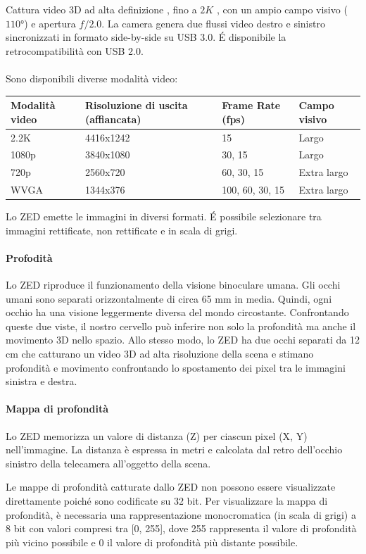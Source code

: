 \documentclass[a4paper]{article}
\begin{document}
Cattura video 3D ad alta definizione , fino a $2K $ , con un ampio campo visivo ($\ang{110}$) e apertura $f/2.0$. La camera genera due flussi video destro e sinistro sincronizzati in formato side-by-side su USB 3.0. \'E disponibile la retrocompatibilità con USB 2.0.
\\
\\
Sono disponibili diverse modalità video:
\begin{center}
\begin{tabular}{llll}
\toprule
Modalità video &Risoluzione di uscita (affiancata) &	Frame Rate (fps) &	Campo visivo \\
\midrule
2.2K&	4416x1242&	15	 &Largo \\
1080p	&3840x1080&	30, 15&	Largo\\
720p&	2560x720&	60, 30, 15&	Extra largo\\
WVGA&	1344x376&	100, 60, 30, 15&	Extra largo\\
\bottomrule
\end{tabular}
\end{center}
Lo ZED emette le immagini in diversi formati. 
\'E possibile selezionare tra immagini rettificate, non rettificate e in scala di grigi.
\paragraph{Profodità}
Lo ZED riproduce il funzionamento della visione binoculare umana. Gli occhi umani sono separati orizzontalmente di circa 65 mm in media. Quindi, ogni occhio ha una visione leggermente diversa del mondo circostante. Confrontando queste due viste, il nostro cervello può inferire non solo la profondità ma anche il movimento 3D nello spazio. Allo stesso modo, lo ZED ha due occhi separati da 12 cm che catturano un video 3D ad alta risoluzione della scena e stimano profondità e movimento confrontando lo spostamento dei pixel tra le immagini sinistra e destra.
\paragraph{Mappa di profondità}
Lo ZED memorizza un valore di distanza (Z) per ciascun pixel (X, Y) nell'immagine. La distanza è espressa in  metri e calcolata dal retro dell'occhio sinistro della telecamera all'oggetto della scena.

Le mappe di profondità catturate dallo ZED non possono essere visualizzate direttamente poiché sono codificate su 32 bit. Per visualizzare la mappa di profondità, è necessaria una rappresentazione monocromatica (in scala di grigi) a 8 bit con valori compresi tra [0, 255], dove 255 rappresenta il valore di profondità più vicino possibile e 0 il valore di profondità più distante possibile.
\end{document}
